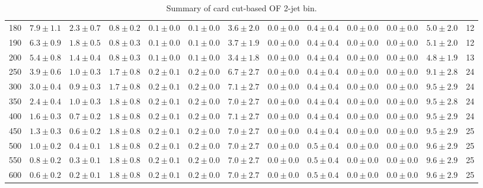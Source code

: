 \begin{table}
{\begin{center}
\begin{tabular}{l | c c | c c c c c c c c  | c c}
180 & $7.9\pm1.1$ & $2.3\pm0.7$ & $0.8\pm0.2$ & $0.1\pm0.0$ & $0.1\pm0.0$ & $3.6\pm2.0$ & $0.0\pm0.0$ & $0.4\pm0.4$ & $0.0\pm0.0$ & $0.0\pm0.0$ & $5.0\pm2.0$ & 12 \\
190 & $6.3\pm0.9$ & $1.8\pm0.5$ & $0.8\pm0.3$ & $0.1\pm0.0$ & $0.1\pm0.0$ & $3.7\pm1.9$ & $0.0\pm0.0$ & $0.4\pm0.4$ & $0.0\pm0.0$ & $0.0\pm0.0$ & $5.1\pm2.0$ & 12 \\
200 & $5.4\pm0.8$ & $1.4\pm0.4$ & $0.8\pm0.3$ & $0.1\pm0.0$ & $0.1\pm0.0$ & $3.4\pm1.8$ & $0.0\pm0.0$ & $0.4\pm0.4$ & $0.0\pm0.0$ & $0.0\pm0.0$ & $4.8\pm1.9$ & 13 \\
250 & $3.9\pm0.6$ & $1.0\pm0.3$ & $1.7\pm0.8$ & $0.2\pm0.1$ & $0.2\pm0.0$ & $6.7\pm2.7$ & $0.0\pm0.0$ & $0.4\pm0.4$ & $0.0\pm0.0$ & $0.0\pm0.0$ & $9.1\pm2.8$ & 24 \\
300 & $3.0\pm0.4$ & $0.9\pm0.3$ & $1.7\pm0.8$ & $0.2\pm0.1$ & $0.2\pm0.0$ & $7.1\pm2.7$ & $0.0\pm0.0$ & $0.4\pm0.4$ & $0.0\pm0.0$ & $0.0\pm0.0$ & $9.5\pm2.9$ & 24 \\
350 & $2.4\pm0.4$ & $1.0\pm0.3$ & $1.8\pm0.8$ & $0.2\pm0.1$ & $0.2\pm0.0$ & $7.0\pm2.7$ & $0.0\pm0.0$ & $0.4\pm0.4$ & $0.0\pm0.0$ & $0.0\pm0.0$ & $9.5\pm2.8$ & 24 \\
400 & $1.6\pm0.3$ & $0.7\pm0.2$ & $1.8\pm0.8$ & $0.2\pm0.1$ & $0.2\pm0.0$ & $7.1\pm2.7$ & $0.0\pm0.0$ & $0.4\pm0.4$ & $0.0\pm0.0$ & $0.0\pm0.0$ & $9.5\pm2.9$ & 24 \\
450 & $1.3\pm0.3$ & $0.6\pm0.2$ & $1.8\pm0.8$ & $0.2\pm0.1$ & $0.2\pm0.0$ & $7.0\pm2.7$ & $0.0\pm0.0$ & $0.4\pm0.4$ & $0.0\pm0.0$ & $0.0\pm0.0$ & $9.5\pm2.9$ & 25 \\
500 & $1.0\pm0.2$ & $0.4\pm0.1$ & $1.8\pm0.8$ & $0.2\pm0.1$ & $0.2\pm0.0$ & $7.0\pm2.7$ & $0.0\pm0.0$ & $0.5\pm0.4$ & $0.0\pm0.0$ & $0.0\pm0.0$ & $9.6\pm2.9$ & 25 \\
550 & $0.8\pm0.2$ & $0.3\pm0.1$ & $1.8\pm0.8$ & $0.2\pm0.1$ & $0.2\pm0.0$ & $7.0\pm2.7$ & $0.0\pm0.0$ & $0.5\pm0.4$ & $0.0\pm0.0$ & $0.0\pm0.0$ & $9.6\pm2.9$ & 25 \\
600 & $0.6\pm0.2$ & $0.2\pm0.1$ & $1.8\pm0.8$ & $0.2\pm0.1$ & $0.2\pm0.0$ & $7.0\pm2.7$ & $0.0\pm0.0$ & $0.5\pm0.4$ & $0.0\pm0.0$ & $0.0\pm0.0$ & $9.6\pm2.9$ & 25 \\
 \hline
 \hline
\end{tabular}
\end{center}
}
\caption{Summary of card cut-based OF 2-jet bin.}
{%
 \tiny
 \begin{center}

\end{center}}
\end{table}
